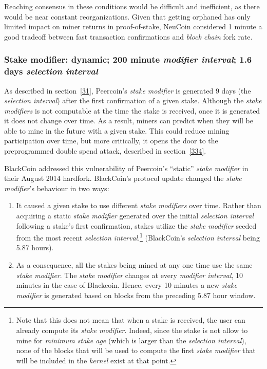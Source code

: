 \documentclass[a4paper,11pt]{article}
\begin{document}
Reaching consensus in these conditions would be difficult and inefficient, as there would be near constant reorganizations. Given that getting orphaned has only limited impact on miner returns in proof-of-stake, NeuCoin considered 1 minute a good tradeoff between fast transaction confirmations and \textit{block chain} fork rate.


\subsubsection*{Stake modifier: dynamic; 200 minute \textit{modifier interval}; 1.6 days \textit{selection interval}}


As described in section~\ref{31}, Peercoin's \textit{stake modifier} is generated 9 days (the \textit{selection interval}) after the first confirmation of a given stake. Although the \textit{stake modifiers} is not computable at the time the stake is received, once it is generated it does not change over time. As a result, miners can predict when they will be able to mine in the future with a given stake. This could reduce mining participation over time, but more critically, it opens the door to the preprogrammed double spend attack, described in section~\ref{334}.

BlackCoin addressed this vulnerability of Peercoin's ``static'' \textit{stake modifier} in their August 2014 hardfork. BlackCoin's protocol update changed the \textit{stake modifier}'s behaviour in two ways:
\begin{enumerate}
\setlength{\itemsep}{0pt}
\item{It caused a given stake to use different \textit{stake modifiers} over time. Rather than acquiring a static \textit{stake modifier} generated over the initial \textit{selection interval} following a stake's first confirmation, stakes utilize the \textit{stake modifier} seeded from the most recent \textit{selection interval}.\footnote{Note that this does not mean that when a stake is received, the user can already compute its \textit{stake modifier}. Indeed, since the stake is not allow to mine for \textit{minimum stake age} (which is larger than the \textit{selection interval}), none of the blocks that will be used to compute the first \textit{stake modifier} that will be included in the \textit{kernel} exist at that point.} (BlackCoin's \textit{selection interval} being 5.87 hours).}
\item{As a consequence, all the stakes being mined at any one time use the same \textit{stake modifier}. The \textit{stake modifier} changes at every \textit{modifier interval}, 10 minutes in the case of Blackcoin. Hence, every 10 minutes a new \textit{stake modifier} is generated based on blocks from the preceding 5.87 hour window.}
\end{enumerate}
\end{document}
